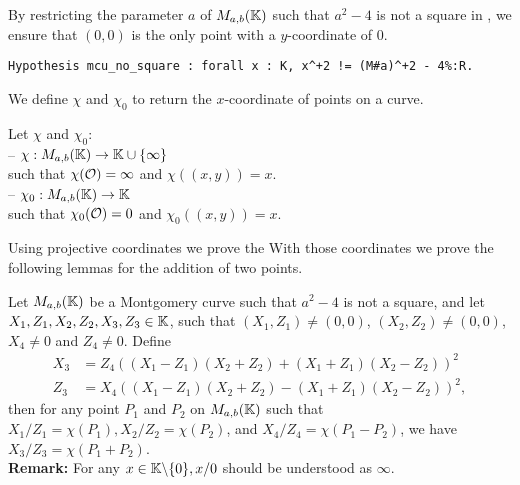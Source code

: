 By restricting the parameter $a$ of $M_{a,b}(\mathbb{K})$ such that $a^2-4$ is not a
square in \K, we ensure that $(0,0)$ is the only point with a $y$-coordinate of $0$.
\begin{lstlisting}[language=Coq]
Hypothesis mcu_no_square : forall x : K, x^+2 != (M#a)^+2 - 4%:R.
\end{lstlisting}

We define $\chi$ and $\chi_0$ to return the $x$-coordinate of points on a curve.
\begin{dfn}Let $\chi$ and $\chi_0$:\\
-- $\chi : M_{a,b}(\mathbb{K}) \to \mathbb{K} \cup \{\infty\}$\\
  such that $\chi(\mathcal{O}) = \infty$ and $\chi((x,y)) = x$.\\
-- $\chi_0 : M_{a,b}(\mathbb{K}) \to \mathbb{K}$\\
  such that $\chi_0(\mathcal{O}) = 0$ and $\chi_0((x,y)) = x$.
\end{dfn}
Using projective coordinates we prove the
With those coordinates we prove the following lemmas for the addition of two points.
\begin{lemma}
\label{lemma:add}
Let $M_{a,b}(\mathbb{K})$ be a Montgomery curve such that $a^2-4$ is not a square, and
let $X_1, Z_1, X_2, Z_2, X_3, Z_3 \in \mathbb{K}$, such that $(X_1,Z_1) \neq (0,0)$, $(X_2,Z_2) \neq (0,0)$, $X_4 \neq 0$ and $Z_4 \neq 0$.
Define
\begin{align*}
X_3 &= Z_4((X_1 - Z_1)(X_2+Z_2) + (X_1+Z_1)(X_2-Z_2))^2\\
Z_3 &= X_4((X_1 - Z_1)(X_2+Z_2) - (X_1+Z_1)(X_2-Z_2))^2,
\end{align*}
then for any point $P_1$ and $P_2$ on $M_{a,b}(\mathbb{K})$ such that $X_1/Z_1 = \chi(P_1), X_2/Z_2 = \chi(P_2)$, and $X_4/Z_4 = \chi(P_1 - P_2)$, we have $X_3/Z_3 = \chi(P_1+P_2)$.\\
\textbf{Remark:} For any $x \in \mathbb{K} \backslash\{0\}, x/0$ should be understood as $\infty$.
\end{lemma}
%
%

